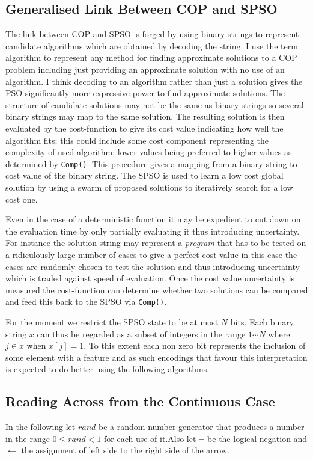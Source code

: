 \documentclass[a4paper,oneside,english]{book}
\numberwithin{equation}{section}
\numberwithin{figure}{section}
\begin{document}
\subsection{Generalised Link Between COP and SPSO}
The link between COP and SPSO is forged by using binary strings to represent candidate algorithms which are obtained by decoding the string. I use the term algorithm to represent any method for finding approximate solutions to a COP problem including just providing an approximate solution with no use of an algorithm. I think decoding to an algorithm rather than just a solution gives the PSO significantly more expressive power to find approximate solutions. The structure of candidate solutions may not be the same as binary strings  so several binary strings may map to the same solution. The resulting solution is then evaluated by the cost-function to give its cost value indicating how well the algorithm fits; this could include some cost component representing the complexity of used algorithm; lower values being preferred to higher values as determined by \texttt{Comp()}. This procedure gives a mapping from a binary string to  cost  value of the binary string. The SPSO is used to learn a low cost global solution by using a swarm of proposed solutions to iteratively search for a low cost one.


Even in the case of a deterministic  function it may be expedient to cut down on the evaluation time by only partially evaluating it thus introducing uncertainty. For instance the solution string may represent a \emph{program} that has to be tested on a ridiculously large number of cases to give a perfect cost value in this case the cases are randomly chosen to test the solution and thus introducing uncertainty which is traded against speed of evaluation. Once the cost value uncertainty is measured the cost-function can determine whether two solutions can be compared and feed this back to the SPSO via \texttt{Comp()}.  

For the moment we restrict the SPSO state to be at most $N$ bits. Each binary string $x$ can thus be regarded as a subset of integers in the range $1 \cdots N$  where $j \in x$ when $x[j] = 1$. To this extent each non zero bit represents the inclusion of some element with a feature and as such encodings that favour this interpretation is expected to do better using the following algorithms. 

\subsection{Reading Across from the Continuous Case}
In the following let $rand$ be a random number generator that produces a number in the range $0\leq rand < 1$ for each use of it.Also let $\neg$ be the logical negation and $\leftarrow$ the assignment of left side to the right side of the arrow.
\end{document}
